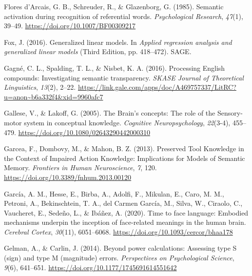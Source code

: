 \documentclass[
  12pt,
  man,floatsintext]{apa7}
\newlength{\cslhangindent}
\newlength{\cslentryspacingunit} %
\newenvironment{CSLReferences}[2] %
 {%
  \setlength{\parindent}{0pt}
  \ifodd #1
  \let\oldpar\par
  \def\par{\hangindent=\cslhangindent\oldpar}
  \fi
  \setlength{\parskip}{#2\cslentryspacingunit}
 }%
 {}
\begin{document}
\begin{CSLReferences}{1}{0}
\leavevmode{}%
Flores d'Arcais, G. B., Schreuder, R., \& Glazenborg, G. (1985). Semantic activation during recognition of referential words. \emph{Psychological Research}, \emph{47}(1), 39--49. \url{https://doi.org/10.1007/BF00309217}

\leavevmode{}%
Fox, J. (2016). Generalized linear models. In \emph{Applied regression analysis and generalized linear models} (Third Edition, pp. 418--472). {SAGE}.

\leavevmode{}%
Gagné, C. L., Spalding, T. L., \& Nisbet, K. A. (2016). Processing {English} compounds: {Investigating} semantic transparency. \emph{SKASE Journal of Theoretical Linguistics}, \emph{13}(2), 2--22. \url{https://link.gale.com/apps/doc/A469757337/LitRC?u=anon~b6a332f4\&xid=9960afc7}

\leavevmode{}%
Gallese, V., \& Lakoff, G. (2005). The {Brain}'s concepts: The role of the {Sensory-motor} system in conceptual knowledge. \emph{Cognitive Neuropsychology}, \emph{22}(3-4), 455--479. \url{https://doi.org/10.1080/02643290442000310}

\leavevmode{}%
Garcea, F., Dombovy, M., \& Mahon, B. Z. (2013). Preserved {Tool Knowledge} in the {Context} of {Impaired Action Knowledge}: {Implications} for {Models} of {Semantic Memory}. \emph{Frontiers in Human Neuroscience}, \emph{7}, 120. \url{https://doi.org/10.3389/fnhum.2013.00120}

\leavevmode{}%
García, A. M., Hesse, E., Birba, A., Adolfi, F., Mikulan, E., Caro, M. M., Petroni, A., Bekinschtein, T. A., del Carmen García, M., Silva, W., Ciraolo, C., Vaucheret, E., Sedeño, L., \& Ibáñez, A. (2020). Time to face language: Embodied mechanisms underpin the inception of face-related meanings in the human brain. \emph{Cerebral Cortex}, \emph{30}(11), 6051--6068. \url{https://doi.org/10.1093/cercor/bhaa178}

\leavevmode{}%
Gelman, A., \& Carlin, J. (2014). Beyond power calculations: Assessing type {S} (sign) and type {M} (magnitude) errors. \emph{Perspectives on Psychological Science}, \emph{9}(6), 641--651. \url{https://doi.org/10.1177/1745691614551642}


\end{CSLReferences}
\end{document}

